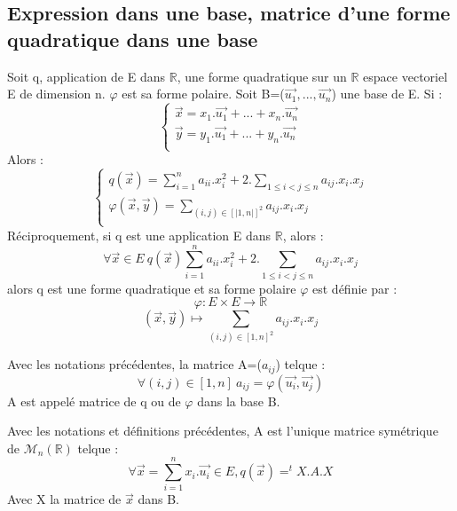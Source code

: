 \subsection{Expression dans une base, matrice d'une forme quadratique dans une base}
\begin{prop}
Soit q, application de E dans $\mathbb{R}$, une forme quadratique sur un $\mathbb{R}$ espace vectoriel E de dimension n. $\varphi$ est sa forme polaire. Soit B=($\overrightarrow{u_1},...,\overrightarrow{u_n}$) une base de E. Si : 
$$\begin{cases}
   \overrightarrow{x} = x_1.\overrightarrow{u_1} + ... + x_n.\overrightarrow{u_n} \\
   \overrightarrow{y} = y_1.\overrightarrow{u_1} + ... + y_n.\overrightarrow{u_n} \\
  \end{cases}
$$
Alors : 
$$
\begin{cases}
 q(\overrightarrow{x}) = \sum_{i=1}^n a_{ii}.x_i^2 + 2.\sum_{1 \leq i < j \leq n} a_{ij}.x_i.x_j \\
 \varphi(\overrightarrow{x},\overrightarrow{y}) = \sum_{(i,j) \in [|1,n|]^2} a_{ij}.x_i.x_j \\
\end{cases}
$$
Réciproquement, si q est une application E dans $\mathbb{R}$, alors : 
$$\forall \overrightarrow{x} \in E~ q(\overrightarrow{x}) \sum_{i=1}^n a_{ii}.x_i^2 + 2.\sum_{1\leq i<j\leq n} a_{ij}.x_i.x_j$$
alors q est une forme quadratique et sa forme polaire $\varphi$ est définie par : 
$$\varphi : E\times E \rightarrow \mathbb{R}$$
$$(\overrightarrow{x},\overrightarrow{y}) \mapsto \sum_{(i,j) \in [1,n]^2} a_{ij}.x_i.x_j$$
\end{prop}
\begin{de}
Avec les notations précédentes, la matrice A=($a_{ij}$) telque :
$$\forall (i,j) \in [1,n]~ a_{ij}= \varphi(\overrightarrow{u_i},\overrightarrow{u_j})$$
A est appelé matrice de q ou de $\varphi$ dans la base B.
\end{de}
\begin{prop}
Avec les notations et définitions précédentes, A est l'unique matrice symétrique de $\mathcal{M}_n(\mathbb{R})$ telque :
$$\forall \overrightarrow{x} = \sum_{i=1}^n x_i.\overrightarrow{u_i} \in E, q(\overrightarrow{x}) = ^tX.A.X$$
Avec X la matrice de $\overrightarrow{x}$ dans B.
\end{prop}
